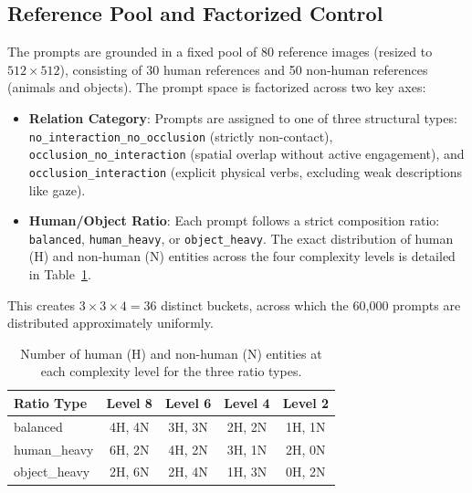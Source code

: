 \subsection{Reference Pool and Factorized Control}
The prompts are grounded in a fixed pool of 80 reference images (resized to $512 \times 512$), consisting of 30 human references and 50 non-human references (animals and objects). The prompt space is factorized across two key axes:
\begin{itemize}
    \item \textbf{Relation Category}: Prompts are assigned to one of three structural types: \texttt{no\_interaction\_\allowbreak no\_occlusion} (strictly non-contact), \texttt{occlusion\_\allowbreak no\_interaction} (spatial overlap without active engagement), and \texttt{occlusion\_\allowbreak interaction} (explicit physical verbs, excluding weak descriptions like gaze).
    \item \textbf{Human/Object Ratio}: Each prompt follows a strict composition ratio: \texttt{balanced}, \texttt{human\_heavy}, or \texttt{object\_heavy}. The exact distribution of human (H) and non-human (N) entities across the four complexity levels is detailed in Table~\ref{tab:entity_ratio_levels}.
\end{itemize}

This creates $3 \times 3 \times 4 = 36$ distinct buckets, across which the 60,000 prompts are distributed approximately uniformly.

\begin{table}[t]
\centering
\small
\caption{Number of human (H) and non-human (N) entities at each complexity level for the three ratio types.}
\label{tab:entity_ratio_levels}
\begin{tabular}{lcccc}
\toprule
\textbf{Ratio Type} & \textbf{Level 8} & \textbf{Level 6} & \textbf{Level 4} & \textbf{Level 2} \\
\midrule
balanced & 4H, 4N & 3H, 3N & 2H, 2N & 1H, 1N \\
human\_heavy & 6H, 2N & 4H, 2N & 3H, 1N & 2H, 0N \\
object\_heavy & 2H, 6N & 2H, 4N & 1H, 3N & 0H, 2N \\
\bottomrule
\end{tabular}
\end{table}

